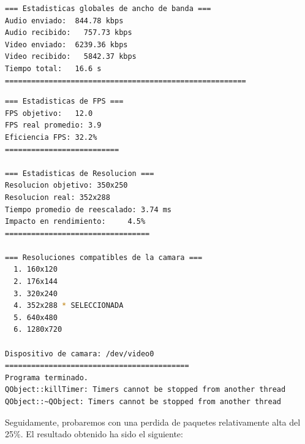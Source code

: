 \begin{adjustbox}{max width=\textwidth}
\begin{lstlisting}[language=bash,basicstyle=\ttfamily\scriptsize]
=== Estadisticas globales de ancho de banda ===
Audio enviado:	844.78 kbps
Audio recibido:   757.73 kbps
Video enviado:	6239.36 kbps
Video recibido:   5842.37 kbps
Tiempo total: 	16.6 s
=======================================================
\end{lstlisting}
\end{adjustbox}

\begin{adjustbox}{max width=\textwidth}
\begin{lstlisting}[language=bash,basicstyle=\ttfamily\scriptsize]
=== Estadisticas de FPS ===
FPS objetivo: 	12.0
FPS real promedio: 3.9
Eficiencia FPS:	32.2%
==========================

=== Estadisticas de Resolucion ===
Resolucion objetivo: 350x250
Resolucion real: 352x288
Tiempo promedio de reescalado: 3.74 ms
Impacto en rendimiento:    	4.5%
=================================

=== Resoluciones compatibles de la camara ===
  1. 160x120
  2. 176x144
  3. 320x240
  4. 352x288 * SELECCIONADA
  5. 640x480
  6. 1280x720

Dispositivo de camara: /dev/video0
==========================================
Programa terminado.
QObject::killTimer: Timers cannot be stopped from another thread
QObject::~QObject: Timers cannot be stopped from another thread
\end{lstlisting}
\end{adjustbox}
\vspace{\baselineskip}

\newpage

Seguidamente, probaremos con una perdida de paquetes relativamente alta del 25\%. El resultado obtenido ha sido el siguiente:
\vspace{\baselineskip}

